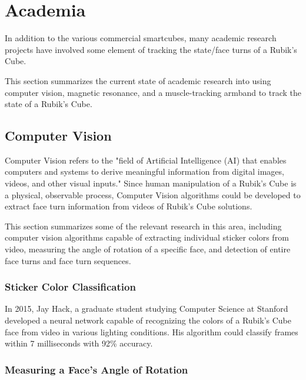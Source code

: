 \section{Academia}
\label{sec:academia}

In addition to the various commercial smartcubes, many academic
research projects have involved some element of tracking the state/face
turns of a Rubik's Cube.

This section summarizes the current state of academic research into
using computer vision, magnetic resonance, and a muscle-tracking
armband to track the state of a Rubik's Cube.

\subsection{Computer Vision}
\label{subsec:computer-vision}

Computer Vision refers to the "field of Artificial Intelligence (AI)
that enables computers and systems to derive meaningful information
from digital images, videos, and other visual inputs."
\cite{ibm-cv-definition} Since human manipulation of a Rubik's Cube is
a physical, observable process, Computer Vision algorithms could be
developed to extract face turn information from videos of Rubik's Cube
solutions.

This section summarizes some of the relevant research in this area,
including computer vision algorithms capable of extracting individual
sticker colors from video, measuring the angle of rotation of a
specific face, and detection of entire face turns and face turn
sequences.

\subsubsection{Sticker Color Classification}

In 2015, Jay Hack, a graduate student studying Computer Science at
Stanford developed a neural network capable of recognizing the colors
of a Rubik's Cube face from video in various lighting conditions. His
algorithm could classify frames within 7 milliseconds with 92\%
accuracy. \cite{hackrubik}

\subsubsection{Measuring a Face's Angle of Rotation}

